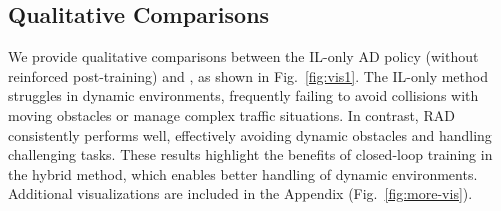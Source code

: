 \subsection{Qualitative Comparisons}
We provide qualitative comparisons between the IL-only AD policy (without reinforced post-training) and \thename{}, as shown in Fig.~\ref{fig:vis1}.
The IL-only method struggles in dynamic environments, frequently failing to avoid collisions with moving obstacles or manage complex traffic situations. In contrast, RAD consistently performs well, effectively avoiding dynamic obstacles and handling challenging tasks. These results highlight the benefits of closed-loop training in the hybrid method, which enables better handling of dynamic environments. Additional visualizations are included in the Appendix (Fig.~\ref{fig:more-vis}). 